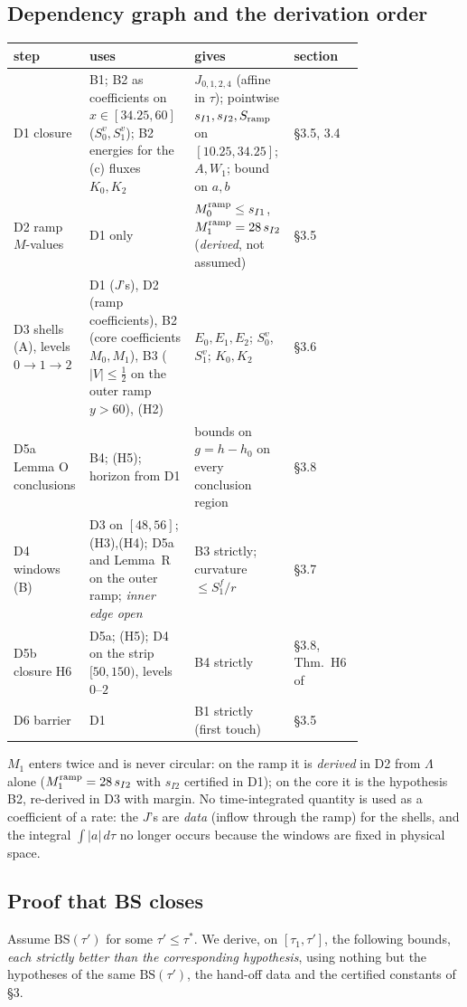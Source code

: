 \documentclass[11pt]{article}
\theoremstyle{definition}
\theoremstyle{remark}
\newcommand{\fn}[1]{\texttt{\detokenize{#1}}}
\begin{document}
\subsection{Dependency graph and the derivation order}
\begin{center}\small\begin{tabular}{@{}l p{0.30\linewidth} p{0.27\linewidth} p{0.2\linewidth}@{}}\toprule
step & uses & gives & section\\\midrule
D1 closure & B1; B2 as coefficients on $x\in[34.25,60]$ ($S_0^v,S_1^v$); B2 energies for the (c) fluxes $K_0,K_2$ & $J_{0,1,2,4}$ (affine in $\tau$); pointwise $s_{I1},s_{I2},S_{\rm ramp}$ on $[10.25,34.25]$; $A,W_1$; bound on $a,b$ & \S3.5, 3.4\\
D2 ramp $M$-values & D1 only & $M_0^{\rm ramp}\le s_{I1}$, $M_1^{\rm ramp}=28\,s_{I2}$ (\emph{derived}, not assumed) & \S3.5\\
D3 shells (A), levels $0\to1\to2$ & D1 ($J$'s), D2 (ramp coefficients), B2 (core coefficients $M_0,M_1$), B3 ($|V|\le\tfrac12$ on the outer ramp $y>60$), (H2) & $E_0,E_1,E_2$; $S_0^v$, $S_1^v$; $K_0,K_2$ & \S3.6\\
D5a Lemma O conclusions & B4; (H5); horizon from D1 & bounds on $g=h-h_0$ on every conclusion region & \S3.8\\
D4 windows (B) & D3 on $[48,56]$; (H3),(H4); D5a and Lemma~R on the outer ramp; \emph{inner edge open} & B3 strictly; curvature $\le S_1^f/r$ & \S3.7\\
D5b closure H6 & D5a; (H5); D4 on the strip $[50,150)$, levels $0$--$2$ & B4 strictly & \S3.8, Thm.~H6 of \fn{lemmaO_v32.tex}\\
D6 barrier & D1 & B1 strictly (first touch) & \S3.5\\\bottomrule
\end{tabular}\end{center}
$M_1$ enters twice and is never circular: on the ramp it is \emph{derived} in D2 from $\Lambda$ alone ($M_1^{\rm ramp}=28\,s_{I2}$ with $s_{I2}$ certified in D1); on the core it is the hypothesis B2, re-derived in D3 with margin. No time-integrated quantity is used as a coefficient of a rate: the $J$'s are \emph{data} (inflow through the ramp) for the shells, and the integral $\int|a|\,d\tau$ no longer occurs because the windows are fixed in physical space.

\subsection{Proof that BS closes}
Assume $\mathrm{BS}(\tau')$ for some $\tau'\le\tau^\ast$. We derive, on $[\tau_1,\tau']$, the following bounds, \emph{each strictly better than the corresponding hypothesis}, using nothing but the hypotheses of the same $\mathrm{BS}(\tau')$, the hand-off data and the certified constants of \S3.
\end{document}
